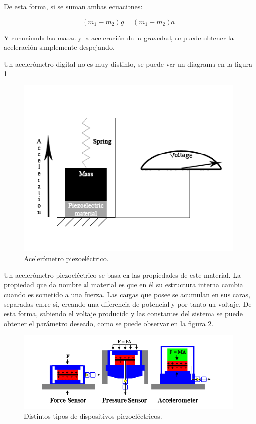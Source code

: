 \documentclass[12pt]{article}
\numberwithin{equation}{section}
\begin{document}
{De esta forma, si se suman ambas ecuaciones:

\begin{equation}
(m_1 -m_2)g = (m_1+m_2)a
\end{equation}

Y conociendo las masas y la aceleración de la gravedad, se puede obtener la aceleración simplemente despejando.

Un acelerómetro digital no es muy distinto, se puede ver un diagrama en la figura \ref{fig:piezoelectric}

\begin{figure}[h]
    \centering
    \includegraphics[scale=0.8]{piezoelectric.png}
    \caption{Acelerómetro piezoeléctrico.}
    \label{fig:piezoelectric}
\end{figure}

Un acelerómetro piezoeléctrico se basa en las propiedades de este material. La propiedad que da nombre al material es que en él su estructura interna cambia cuando es sometido a una fuerza. Las cargas que posee se acumulan en sus caras, separadas entre si, creando una diferencia de potencial y por tanto un voltaje. De esta forma, sabiendo el voltaje producido y las constantes del sistema se puede obtener el parámetro deseado, como se puede observar en la figura \ref{fig:piezotypes}.

\begin{figure}[h]
    \centering
    \includegraphics[width=1\textwidth]{piezoelectrictypes.png}
    \caption{Distintos tipos de dispositivos piezoeléctricos.}
    \label{fig:piezotypes}
\end{figure}

}
\end{document}
